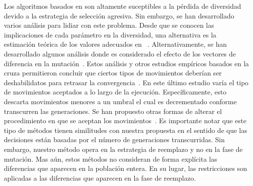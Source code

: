 Los algoritmos basados en \DE{} son altamente suceptibles a la pérdida de diversidad devido a la estrategia de selección agresiva.
%
Sin embargo, se han desarrollado varios análisis para lidiar con este problema.
%
Desde que se conocen las implicaciones de cada parámetro en la diversidad, una alternativa es la estimación teórica de los valores adecuados en \DE{}~\cite{zaharie2003control}.
%
Alternativamente, se han desarrollado algunos análisis donde es considerado el efecto de los vectores de diferencia en la mutación~\cite{montgomery2009differential}.
%
Estos análisis y otros estudios empíricos basados en la cruza permitieron concluir que ciertos tipos de movimientos deberían ser deshabilidatos para retrasar la convergencia~\cite{montgomery2012simple}.
%
En este último estudio varía el tipo de movimientos aceptados a lo largo de la ejecución.
%
Específicamente, esto descarta movimientos menores a un umbral el cual es decrementado conforme transcurren las generaciones.
%
Se han propuesto otras formas de alterar el procedimiento en que se aceptan los movimientos~\cite{bolufe2013differential}.
%
Es importante notar que este tipo de métodos tienen similitudes con nuestra propuesta en el sentido de que las decisiones están basadas por el número de generaciones transcurridas.
%
Sin embargo, nuestro método opera en la estrategia de reemplazo y no en la fase de mutación.
%
Mas aún, estos métodos no consideran de forma explícita las diferencias que aparecen en la población entera.
%
En su lugar, las restricciones son aplicadas a las diferencias que aparecen en la fase de reemplazo.

